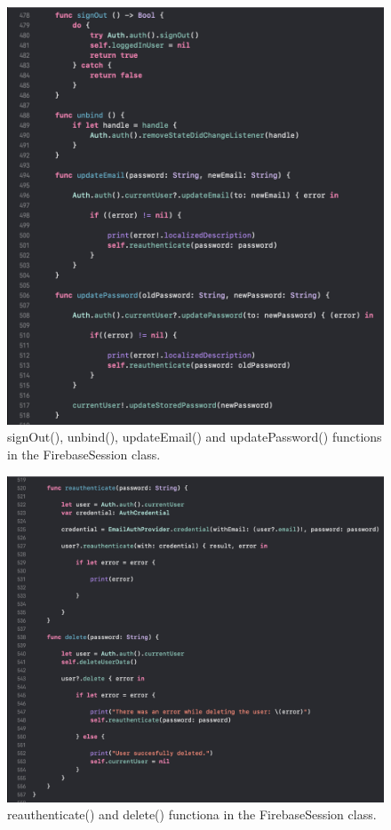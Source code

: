 \begin{figure}[H]
    \centering
    \includegraphics[width=\textwidth]{./graphics/Implementation/Settings/firebasesession3.png}
    \caption{signOut(), unbind(), updateEmail() and updatePassword() functions in the FirebaseSession class.}
    \label{fig:firebasesession3_settings}
\end{figure}

\begin{figure}[H]
    \centering
    \includegraphics[width=\textwidth]{./graphics/Implementation/Settings/firebasesession4.png}
    \caption{reauthenticate() and delete() functiona in the FirebaseSession class.}
    \label{fig:firebasesession4_settings}
\end{figure}